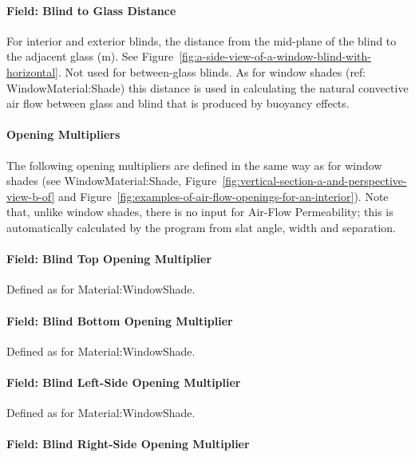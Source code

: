 \paragraph{Field: Blind to Glass Distance}\label{field-blind-to-glass-distance}

For interior and exterior blinds, the distance from the mid-plane of the blind to the adjacent glass (m). See Figure~\ref{fig:a-side-view-of-a-window-blind-with-horizontal}. Not used for between-glass blinds. As for window shades (ref: WindowMaterial:Shade) this distance is used in calculating the natural convective air flow between glass and blind that is produced by buoyancy effects.

\paragraph{Opening Multipliers}\label{opening-multipliers}

The following opening multipliers are defined in the same way as for window shades (see WindowMaterial:Shade, Figure~\ref{fig:vertical-section-a-and-perspective-view-b-of} and Figure~\ref{fig:examples-of-air-flow-openings-for-an-interior}). Note that, unlike window shades, there is no input for Air-Flow Permeability; this is automatically calculated by the program from slat angle, width and separation.

\paragraph{Field: Blind Top Opening Multiplier}\label{field-blind-top-opening-multiplier}

Defined as for Material:WindowShade.

\paragraph{Field: Blind Bottom Opening Multiplier}\label{field-blind-bottom-opening-multiplier}

Defined as for Material:WindowShade.

\paragraph{Field: Blind Left-Side Opening Multiplier}\label{field-blind-left-side-opening-multiplier}

Defined as for Material:WindowShade.

\paragraph{Field: Blind Right-Side Opening Multiplier}\label{field-blind-right-side-opening-multiplier}

